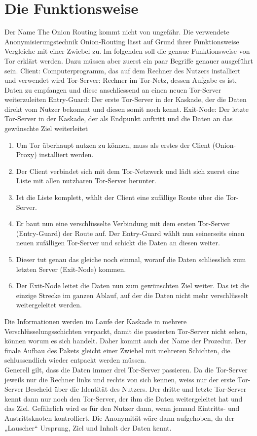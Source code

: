 \section{Die Funktionsweise}
Der Name The Onion Routing kommt nicht von ungefähr. Die verwendete Anonymisierungstechnik Onion-Routing lässt auf Grund ihrer Funktionsweise Vergleiche mit einer Zwiebel zu. Im folgenden soll die genaue Funktionsweise von Tor erklärt werden. Dazu müssen aber zuerst ein paar Begriffe genauer ausgeführt sein.
Client: Computerprogramm, das auf dem Rechner des Nutzers installiert und verwendet wird
Tor-Server: Rechner im Tor-Netz, dessen Aufgabe es ist, Daten zu empfangen und diese anschliessend an einen neuen Tor-Server weiterzuleiten
Entry-Guard: Der erste Tor-Server in der Kaskade, der die Daten direkt vom Nutzer bekommt und diesen somit noch kennt.
Exit-Node: Der letzte Tor-Server in der Kaskade, der als Endpunkt auftritt und die Daten an das gewünschte Ziel weiterleitet
\begin{enumerate}
\item Um Tor überhaupt nutzen zu können, muss als erstes der  Client (Onion-Proxy) installiert werden.
\item Der Client verbindet sich mit dem Tor-Netzwerk und lädt sich zuerst eine Liste mit allen nutzbaren Tor-Server herunter.
\item Ist die Liste komplett, wählt der Client eine zufällige Route über die Tor-Server.
\item Er baut nun eine verschlüsselte Verbindung mit dem ersten Tor-Server (Entry-Guard) der Route auf. Der Entry-Guard wählt nun seinerseits einen neuen zufälligen Tor-Server und schickt die Daten an diesen weiter.
\item Dieser tut genau das gleiche noch einmal, worauf die Daten schliesslich zum letzten Server (Exit-Node) kommen.
\item Der Exit-Node leitet die Daten nun zum gewünschten Ziel weiter. Das ist die einzige Strecke im ganzen Ablauf, auf der die Daten nicht mehr verschlüsselt weitergeleitet werden.
\end{enumerate}
Die Informationen werden im Laufe der Kaskade in mehrere Verschlüsselungsschichten verpackt, damit die passierten Tor-Server nicht sehen, können worum es sich handelt. Daher kommt auch der Name der Prozedur. Der finale Aufbau des Pakets gleicht einer Zwiebel mit mehreren Schichten, die  schlussendlich wieder entpackt werden müssen.
\\
Generell gilt, dass die Daten immer drei Tor-Server passieren. Da die Tor-Server jeweils nur die Rechner links und rechts von sich kennen, weiss nur der erste Tor-Server Bescheid über die Identität des Nutzers. Der dritte und letzte Tor-Server kennt dann nur noch den Tor-Server, der ihm die Daten weitergeleitet hat und das Ziel. Gefährlich wird es für den Nutzer dann, wenn jemand Eintritts- und Austrittsknoten kontrolliert. Die Anonymität wäre dann aufgehoben, da der „Lauscher“ Ursprung, Ziel und Inhalt der Daten kennt.
